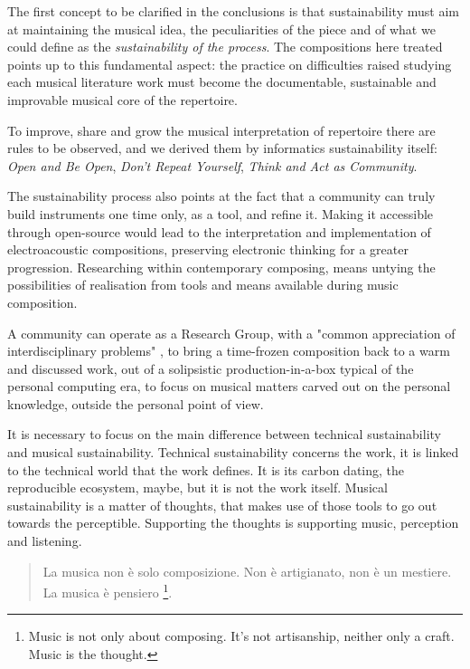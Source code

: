 \documentclass[twoside,a4paper]{article}
\begin{document}
The first concept to be clarified in the conclusions is that sustainability must aim at maintaining the musical idea, the peculiarities of the piece and of what we could define as the \emph{sustainability of the process}. The compositions here treated points up to this fundamental aspect: the practice on difficulties raised studying each musical literature work must become the documentable, sustainable and improvable musical core of the repertoire.

To improve, share and grow the musical interpretation of repertoire there are rules to be observed, and we derived them by informatics sustainability itself: \emph{Open and Be Open}, \emph{Don't Repeat Yourself}, \emph{Think and Act as Community}.

The sustainability process also points at the fact that a community can truly build instruments one time only, as a tool, and refine it. Making it accessible through open-source would lead to the interpretation and implementation of electroacoustic compositions, preserving electronic thinking for a greater progression. Researching within contemporary composing, means untying the possibilities of realisation from tools and means available during music composition.

A community can operate as a Research Group, with a "common appreciation of interdisciplinary problems" \cite{ml91}, to bring a time-frozen composition back to a warm and discussed work, out of a solipsistic production-in-a-box typical of the personal computing era, to focus on musical matters carved out on the personal knowledge, outside the personal point of view.

It is necessary to focus on the main difference between technical sustainability and musical sustainability. Technical sustainability concerns the work, it is linked to the technical world that the work defines. It is its carbon dating, the reproducible ecosystem, maybe, but it is not the work itself. Musical sustainability is a matter of thoughts, that makes use of those tools to go out towards the perceptible. Supporting the thoughts is supporting music, perception and listening.

\begin{quote}
La musica non è solo composizione. Non è artigianato, non è un mestiere. La musica è pensiero \cite{nono85}\footnote{Music is not only about composing. It’s not artisanship, neither only a craft. Music is the thought.}.
\end{quote}
%
\end{document}
